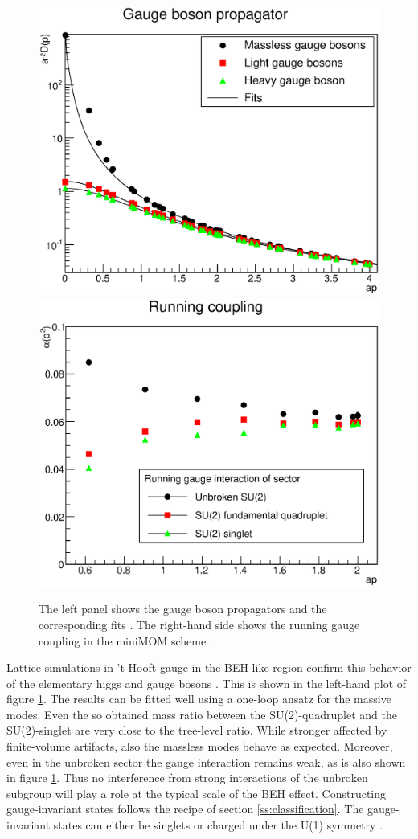 \documentclass[final,12pt]{article}
\newcommand*{\1}{1\!\!\!\bot}
\begin{document}
\begin{figure}
\includegraphics[width=0.5\linewidth]{WPropV20}\includegraphics[width=0.5\linewidth]{alpha-gut}
\caption{\label{fig:gut}The left panel shows the gauge boson propagators and the corresponding fits \cite{Maas:2016ngo}. The right-hand side shows the running gauge coupling in the miniMOM scheme \cite{Maas:unpublishedtoerek}.}
\end{figure}

Lattice simulations in 't Hooft gauge in the BEH-like region confirm this behavior of the elementary higgs and gauge bosons \cite{Maas:2016ngo,Maas:unpublishedtoerek}. This is shown in the left-hand plot of figure \ref{fig:gut}. The results can be fitted well using a one-loop ansatz for the massive modes. Even the so obtained mass ratio between the SU(2)-quadruplet and the SU(2)-singlet are very close to the tree-level ratio. While stronger affected by finite-volume artifacts, also the massless modes behave as expected. Moreover, even in the unbroken sector the gauge interaction remains weak, as is also shown in figure \ref{fig:gut}. Thus no interference from strong interactions of the unbroken subgroup will play a role at the typical scale of the BEH effect. Constructing gauge-invariant states follows the recipe of section \ref{ss:classification}. The gauge-invariant states can either be singlets or charged under the U(1) symmetry \cite{Maas:2017xzh}.
\end{document}
